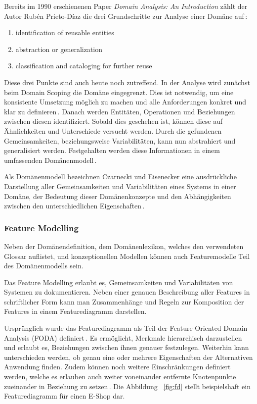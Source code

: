 \documentclass[12pt,oneside,a4paper,parskip]{scrbook}
\begin{document}
Bereits im 1990 erschienenen Paper \textit{Domain Analysis: An Introduction} zählt der Autor Rubén Prieto-Díaz die drei Grundschritte zur Analyse einer Domäne auf\,\cite{prieto1990}:

\begin{enumerate}[itemsep=-10pt]
\item identification of reusable entities
\item abstraction or generalization
\item classification and cataloging for further reuse
\end{enumerate}

Diese drei Punkte sind auch heute noch zutreffend. In der Analyse wird zunächst beim Domain Scoping die Domäne eingegrenzt. Dies ist notwendig, um eine konsistente Umsetzung möglich zu machen und alle Anforderungen konkret und klar zu definieren\,\cite[S. 239]{stahl2007}. Danach werden Entitäten, Operationen und Beziehungen zwischen diesen identifiziert. Sobald dies geschehen ist, können diese auf Ähnlichkeiten und Unterschiede versucht werden. Durch die gefundenen Gemeinsamkeiten, beziehungsweise Variabilitäten, kann nun abstrahiert und generalisiert werden. Festgehalten werden diese Informationen in einem umfassenden Domänenmodell\,\cite[S. 24ff.]{czaeis2000}.

Als Domänenmodell bezeichnen Czarnecki und Eisenecker eine ausdrückliche Darstellung aller Gemeinsamkeiten und Variabilitäten eines Systems in einer Domäne, der Bedeutung dieser Domänenkonzepte und den Abhängigkeiten zwischen den unterschiedlichen Eigenschaften\,\cite[S. 23f.]{czaeis2000}.

\subsubsection{Feature Modelling}

Neben der Domänendefinition, dem Domänenlexikon, welches den verwendeten Glossar auflistet, und konzeptionellen Modellen können auch Featuremodelle Teil des Domänenmodells sein.

Das Feature Modelling erlaubt es, Gemeinsamkeiten und Variabilitäten von Systemen zu dokumentieren. Neben einer genauen Beschreibung aller Features in schriftlicher Form kann man Zusammenhänge und Regeln zur Komposition der Features in einem Featurediagramm darstellen.

Ursprünglich wurde das Featurediagramm als Teil der Feature-Oriented Domain Analysis (FODA) definiert\,\cite{kang1990}. Es ermöglicht, Merkmale hierarchisch darzustellen und erlaubt es, Beziehungen zwischen ihnen genauer festzulegen. Weiterhin kann unterschieden werden, ob genau eine oder mehrere Eigenschaften der Alternativen Anwendung finden. Zudem können noch weitere Einschränkungen definiert werden, welche es erlauben auch weiter voneinander entfernte Knotenpunkte zueinander in Beziehung zu setzen\,\cite[S. 240f.]{stahl2007}. Die Abbildung ~\ref{fig:fd} stellt beispielshaft ein Featurediagramm für einen E-Shop dar.
\end{document}
